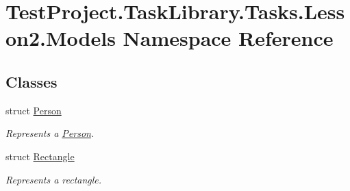 \hypertarget{namespace_test_project_1_1_task_library_1_1_tasks_1_1_lesson2_1_1_models}{}\section{Test\+Project.\+Task\+Library.\+Tasks.\+Lesson2.\+Models Namespace Reference}
\label{namespace_test_project_1_1_task_library_1_1_tasks_1_1_lesson2_1_1_models}
\subsection*{Classes}
\begin{DoxyCompactItemize}
\item 
struct \mbox{\hyperlink{struct_test_project_1_1_task_library_1_1_tasks_1_1_lesson2_1_1_models_1_1_person}{Person}}
\begin{DoxyCompactList}\small\item\em Represents a \mbox{\hyperlink{struct_test_project_1_1_task_library_1_1_tasks_1_1_lesson2_1_1_models_1_1_person}{Person}}. \end{DoxyCompactList}\item 
struct \mbox{\hyperlink{struct_test_project_1_1_task_library_1_1_tasks_1_1_lesson2_1_1_models_1_1_rectangle}{Rectangle}}
\begin{DoxyCompactList}\small\item\em Represents a rectangle. \end{DoxyCompactList}\end{DoxyCompactItemize}
